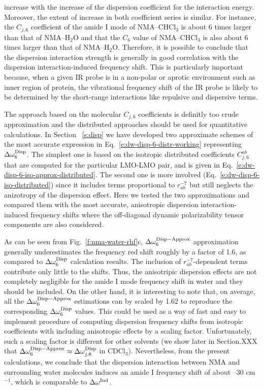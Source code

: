 \documentclass[a4paper,titlepage,twoside,fleqn,12pt]{book}
\begin{document}
\begin{refsection}
increase with the increase of the dispersion coefficient for the interaction
energy. Moreover, the extent of increase in both coefficient series
is similar. For instance, the $C_{j,6}$ coefficient of the
amide I mode of NMA--CHCl$_3$ is about 6 times larger than
that of NMA--H$_2$O and that the $C_6$ value of NMA--CHCl$_3$ is
also about 6 times larger than that of NMA--H$_2$O. Therefore,
it is possible to conclude that the dispersion interaction
strength is generally in good correlation with the dispersion
interaction\hyp{}induced frequency shift. This is particularly important
because, when a given IR probe is in a non\hyp{}polar or aprotic
environment such as inner region of protein, the vibrational
frequency shift of the IR probe is likely to be determined
by the short\hyp{}range interactions like repulsive and dispersive
terms.

The approach based on the molecular $C_{j,6}$ coefficients 
is definitly too crude approximation and the distributed approaches
should be used for quantitative calculations. 
In Section ~\ref{s:disp} we have developed two
approximate schemes of the most accurate expression in Eq.~\eqref{e:dw-disp-6-distr-working}
representing $\Delta\omega^{\rm Disp}_6$. The simplest
one is based on the isotropic distributed coefficients $C_{j,6}^{ab}$
that are computed for the particular LMO-LMO pair, and is given
in Eq.~\eqref{e:dw-disp-6-iso-approx-distributed}. 
The second one is more involved (Eq.~\eqref{e:dw-disp-6-iso-distributed}) since
it includes terms proportional to $r^{-7}_{ab}$ but still neglects the anizotropy
of the dispersion effect. Here we tested the two approximations
and compared them with the most accurate, anisotropic dispersion
interaction\hyp{}induced frequency shifts where
the off\hyp{}diagonal dynamic polarizability tensor components
are also considered.

As can be seen from Fig.~\ref{f:nma-water-rhf}c,
$\Delta \omega_{6}^{\rm Disp-Approx}$ approximation generally
underestimates the frequency red shift roughly by a factor of 1.6,
as compared to $\Delta\omega^{\rm Disp}_6$ calculation results.
The inclusion of $r^{-7}_{ab}$\hyp{}dependent terms contribute 
only little to the shifts. Thus, the anisotripic dispersion effects
are not completely negligible for the amide I mode frequency shift
in water and they should be included. On the other hand, it is interesting
to note that, on average, all the $\Delta \omega_{6}^{\rm Disp-Approx}$
estimations can by scaled by 1.62 to reproduce the corresponding $\Delta\omega^{\rm Disp}_6$
values. This could be used as a way of fast and easy to implement
procedure of computing dispersion frequency shifts from isotropic
coefficients with including anisotropic effects by a scaling factor.
Unfortunately, such a scaling
factor is different for other solvents 
(we show later in Section.XXX that 
$\Delta \omega_{6}^{\rm Disp-Approx}\approx\Delta \omega_{j,6}^{\rm Disp}$
in CDCl$_3$). 
Nevertheless, from the present calculations, we conclude that the dispersion
interaction between NMA and surrounding water molecules
induces an amide I frequency shift of about --30 cm$^{-1}$, which is
comparable to $\Delta \omega^{\rm Ind}$.


\end{refsection}
\end{document}
